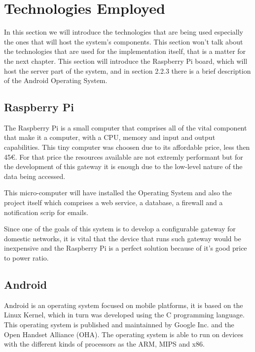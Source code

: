 
\section{Technologies Employed}
\label{chap2:sec:tech}
In this section we will introduce the technologies that are being used
especially the ones that will host the system's components. This section won't
talk about the technologies that are used for the implementation itself, that is
a matter for the next chapter. This section will introduce the Raspberry Pi
board, which will host the server part of the system, and in section 2.2.3 there
is a brief description of the Android Operating System.

\subsection{Raspberry Pi}
\label{chap2:sec:tech:rasp}
The Raspberry Pi is a small computer that comprises all of the vital component
that make it a computer, with a CPU, memory and input and output capabilities.
This tiny computer was choosen due to its affordable price, less then 45€. For
that price the resources available are not extremly performant but for the
development of this gateway it is enough due to the low-level nature of the data
being accessed.

This micro-computer will have installed the Operating System and also the
project itself which comprises a web service, a database, a firewall and a
notification scrip for emails.

Since one of the goals of this system is to develop a configurable gateway for
domestic networks, it is vital that the device that runs such gateway would be
inexpensive and the Raspberry Pi is a perfect solution because of it's good
price to power ratio.

\subsection{Android}
\label{chap2:sec:tech:android}
Android is an operating system focused on mobile platforms, it is based on the
Linux Kernel, which in turn was developed using the C programming language. This
operating system is published and maintainned by Google Inc. and the Open
Handset Alliance (OHA). The operating system is able to run on devices with the
different kinds of processors as the ARM, MIPS and x86.

